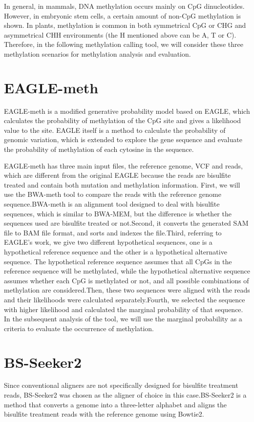 \documentclass{PHlab-thesis}
\begin{document}
\par
In general, in mammals, DNA methylation occurs mainly on CpG dinucleotides. However, in embryonic stem cells, a certain amount of non-CpG methylation is shown. In plants, methylation is common in both symmetrical CpG or CHG and asymmetrical CHH environments (the H mentioned above can be A, T or C). Therefore, in the following methylation calling tool, we will consider these three methylation scenarios for methylation analysis and evaluation.

\section{EAGLE-meth}
EAGLE-meth is a modified generative probability model based on EAGLE\cite{kuo2018eagle}, which calculates the probability of methylation of the CpG site and gives a likelihood value to the site. EAGLE itself is a method to calculate the probability of genomic variation, which is extended to explore the gene sequence and evaluate the probability of methylation of each cytosine in the sequence.

\par
EAGLE-meth has three main input files, the reference genome, VCF and reads, which are different from the original EAGLE because the reads are bisulfite treated and contain both mutation and methylation information. First, we will use the BWA-meth tool to compare the reads with the reference genome sequence.BWA-meth is an alignment tool designed to deal with bisulfite sequences, which is similar to BWA-MEM, but the difference is whether the sequences used are bisulfite treated or not.Second, it converts the generated SAM file to BAM file format, and sorts and indexes the file.Third, referring to EAGLE's work, we give two different hypothetical sequences, one is a hypothetical reference sequence and the other is a hypothetical alternative sequence. The hypothetical reference sequence assumes that all CpGs in the reference sequence will be methylated, while the hypothetical alternative sequence assumes whether each CpG is methylated or not, and all possible combinations of methylation are considered.Then, these two sequences were aligned with the reads and their likelihoods were calculated separately.Fourth, we selected the sequence with higher likelihood and calculated the marginal probability of that sequence. In the subsequent analysis of the tool, we will use the marginal probability as a criteria to evaluate the occurrence of methylation.

\section{BS-Seeker2}
Since conventional aligners are not specifically designed for bisulfite treatment reads, BS-Seeker2 was chosen as the aligner of choice in this case.BS-Seeker2 is a method that converts a genome into a three-letter alphabet and aligns the bisulfite treatment reads with the reference genome using Bowtie2.
\end{document}
